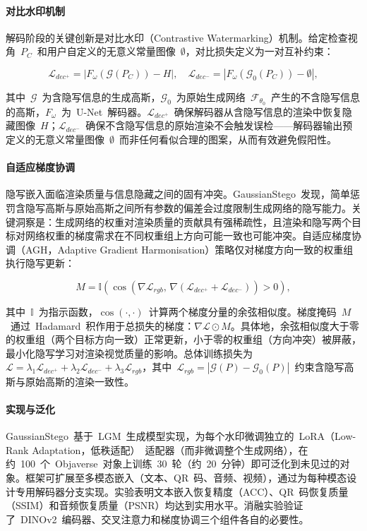\paragraph{对比水印机制}解码阶段的关键创新是对比水印（Contrastive Watermarking）机制。给定检查视角~$P_C$~和用户自定义的无意义常量图像~$\emptyset$，对比损失定义为一对互补约束：

\begin{equation}
    \mathcal{L}_{dec^+} = |F_\omega(\mathcal{G}(P_C)) - H|, \quad \mathcal{L}_{dec^-} = |F_\omega(\mathcal{G}_0(P_C)) - \emptyset|,
\end{equation}

其中~$\mathcal{G}$~为含隐写信息的生成高斯，$\mathcal{G}_0$~为原始生成网络~$\mathcal{F}_{\theta_0}$~产生的不含隐写信息的高斯，$F_\omega$~为~U-Net~解码器。$\mathcal{L}_{dec^+}$~确保解码器从含隐写信息的渲染中恢复隐藏图像~$H$；$\mathcal{L}_{dec^-}$~确保不含隐写信息的原始渲染不会触发误检——解码器输出预定义的无意义常量图像~$\emptyset$~而非任何看似合理的图案，从而有效避免假阳性。

\paragraph{自适应梯度协调}隐写嵌入面临渲染质量与信息隐藏之间的固有冲突。GaussianStego~发现，简单惩罚含隐写高斯与原始高斯之间所有参数的偏差会过度限制生成网络的隐写能力。关键洞察是：生成网络的权重对渲染质量的贡献具有强稀疏性，且渲染和隐写两个目标对网络权重的梯度需求在不同权重组上方向可能一致也可能冲突。自适应梯度协调（AGH，Adaptive Gradient Harmonisation）策略仅对梯度方向一致的权重组执行隐写更新：

\begin{equation}
    M = \mathbb{I}\!\left(\cos\!\left(\nabla \mathcal{L}_{rgb},\, \nabla(\mathcal{L}_{dec^+} + \mathcal{L}_{dec^-})\right) > 0\right),
\end{equation}

其中~$\mathbb{I}$~为指示函数，$\cos(\cdot,\cdot)$~计算两个梯度分量的余弦相似度。梯度掩码~$M$~通过~Hadamard~积作用于总损失的梯度：$\nabla\mathcal{L} \odot M$。具体地，余弦相似度大于零的权重组（两个目标方向一致）正常更新，小于零的权重组（方向冲突）被屏蔽，最小化隐写学习对渲染视觉质量的影响。总体训练损失为~$\mathcal{L} = \lambda_1 \mathcal{L}_{dec^+} + \lambda_2 \mathcal{L}_{dec^-} + \lambda_3 \mathcal{L}_{rgb}$，其中~$\mathcal{L}_{rgb} = |\mathcal{G}(P) - \mathcal{G}_0(P)|$~约束含隐写高斯与原始高斯的渲染一致性。

\paragraph{实现与泛化}GaussianStego~基于~LGM~生成模型实现，为每个水印微调独立的~LoRA（Low-Rank Adaptation，低秩适配）~适配器（而非微调整个生成网络），在约~100~个~Objaverse~对象上训练~30~轮（约~20~分钟）即可泛化到未见过的对象。框架可扩展至多模态嵌入（文本、QR~码、音频、视频），通过为每种模态设计专用解码器分支实现。实验表明文本嵌入恢复精度（ACC）、QR~码恢复质量（SSIM）和音频恢复质量（PSNR）均达到实用水平。消融实验验证了~DINOv2~编码器、交叉注意力和梯度协调三个组件各自的必要性。

